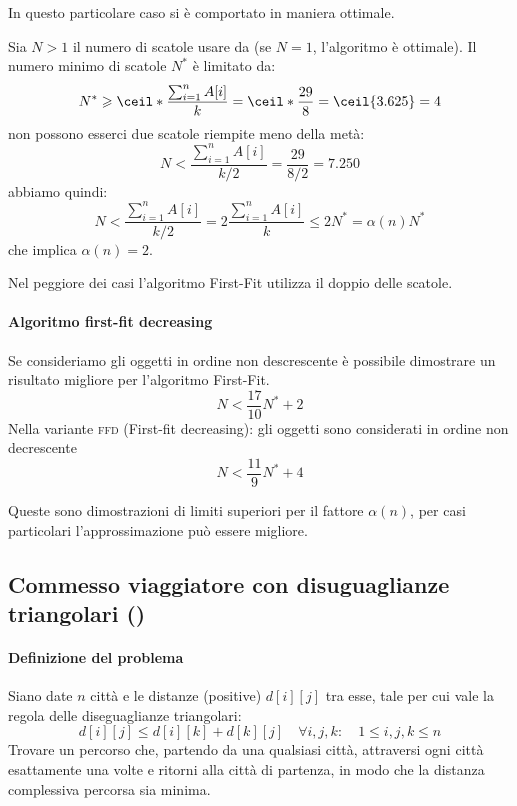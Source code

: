 \begin{figure}[H]
	\centering
\end{figure}

In questo particolare caso si è comportato in maniera ottimale.

Sia \(N > 1\) il numero di scatole usare da {\firstFit} (se \(N=1\), l'algoritmo è ottimale).
Il numero minimo di scatole \(N^*\) è limitato da:
\[
	N^{*} \geqslant \ceil*{\frac{\sum_{i=1}^n A[i]}{k}} = \ceil*{\frac{29}{8}} = \ceil{3.625} = 4
\]
non possono esserci due scatole riempite meno della metà:
\[
	N < \frac{\sum_{i=1}^n A[i]}{k/2} = \frac{29}{8/2} = 7.250
\]
abbiamo quindi:
\[
	N < \frac{\sum_{i=1}^n A[i]}{k/2} = 2 \frac{\sum_{i=1}^n A[i]}{k} \leqslant 2N^* = \alpha(n) N^{*}
\]
che implica \(\alpha(n) = 2\).

\begin{note}
Nel peggiore dei casi l'algoritmo First-Fit utilizza il doppio delle scatole.
\end{note}

\paragraph{Algoritmo first-fit decreasing}
Se consideriamo gli oggetti in ordine non descrescente è possibile dimostrare un risultato migliore per l'algoritmo First-Fit.
\[
	N < \frac{17}{10} N^{*} + 2
\]
Nella variante \textsc{ffd} (First-fit decreasing): gli oggetti sono considerati in ordine non decrescente
\[
	N < \frac{11}{9} N^{*} + 4
\]
\begin{note}
Queste sono dimostrazioni di limiti superiori per il fattore \(\alpha(n)\), per casi particolari l'approssimazione può essere migliore.
\end{note}

\subsection{Commesso viaggiatore con disuguaglianze triangolari \texorpdfstring{({\deltaTsp})}{}}

\paragraph{Definizione del problema}
Siano date \(n\) città e le distanze (positive) \(d[i][j]\) tra esse, \alert{tale per cui vale la regola delle diseguaglianze triangolari}:
\[
	d[i][j] \leqslant d[i][k] + d[k][j] \quad \forall i,j,k: \quad 1 \leqslant i,j,k \leqslant n
\]
Trovare un percorso che, partendo da una qualsiasi città, attraversi ogni città esattamente una volte e ritorni alla città di partenza, in modo che la distanza complessiva percorsa sia minima.

